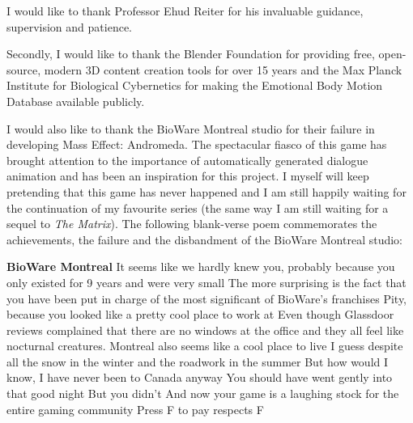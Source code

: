 \documentclass[phd]{abdnthesis}
\begin{document}
\begin{acknowledgements}
  I would like to thank Professor Ehud Reiter for his invaluable guidance, supervision and patience. 

  Secondly, I would like to thank the Blender Foundation for providing free, open-source, modern 3D content creation tools for over 15 years and the Max Planck Institute for Biological Cybernetics for making the Emotional Body Motion Database available publicly.
  
  I would also like to thank the BioWare Montreal studio for their failure in developing Mass Effect: Andromeda. The spectacular fiasco of this game has brought attention to the importance of automatically generated dialogue animation and has been an inspiration for this project. I myself will keep pretending that this game has never happened and I am still happily waiting for the continuation of my favourite series (the same way I am still waiting for a sequel to \textit{The Matrix}). The following blank-verse poem commemorates the achievements, the failure and the disbandment of the BioWare Montreal studio:
  
  \bigskip
  \noindent \textbf{BioWare Montreal}\newline
  It seems like we hardly knew you,\newline
  probably because you only existed for 9 years and were very small\newline
  The more surprising is the fact that\newline
  you have been put in charge of the most significant of BioWare's franchises\newline
  \newline
  Pity,\newline
  because you looked like a pretty cool place to work at\newline
  Even though Glassdoor reviews complained that there are no windows at the office\newline
  and they all feel like nocturnal creatures.\newline
  Montreal also seems like a cool place to live I guess\newline
  despite all the snow in the winter and the roadwork in the summer\newline
  But how would I know, I have never been to Canada anyway\newline
  \newline
  You should have went gently into that good night\newline
  But you didn't\newline
  And now your game is a laughing stock for the entire gaming community\newline
  Press F to pay respects\newline
  F
  
  
  
  
\end{acknowledgements}
\end{document}
